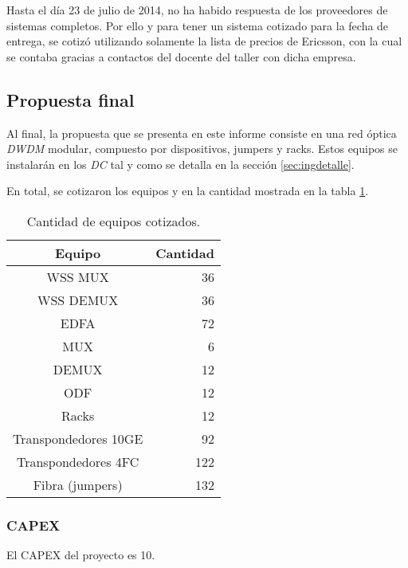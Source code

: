 
Hasta el día 23 de julio de 2014, no ha habido respuesta de los
proveedores de sistemas completos. Por ello y para tener un sistema
cotizado para la fecha de entrega, se cotizó utilizando solamente la
lista de precios de Ericsson, con la cual se contaba gracias a
contactos del docente del taller con dicha empresa.

\subsection{Propuesta final}
\label{sec:ppfinal}

Al final, la propuesta que se presenta en este informe consiste en una
red óptica \emph{DWDM} modular, compuesto por dispositivos, jumpers y
racks. Estos equipos se instalarán en los \emph{DC} tal y como se
detalla en la sección \ref{sec:ingdetalle}.

En total, se cotizaron los equipos y en la cantidad mostrada en la
tabla \ref{tab:propfinal}.

\begin{table}[H]
  \centering
  \begin{tabular}{| c | r |}
    \hline
    Equipo & Cantidad \\
    \hline
    WSS MUX & 36 \\
    WSS DEMUX & 36 \\
    EDFA & 72 \\
    MUX & 6 \\
    DEMUX & 12 \\
    ODF & 12 \\
    Racks & 12 \\
    Transpondedores 10GE & 92 \\
    Transpondedores 4FC & 122 \\
    Fibra (jumpers) & 132 \\
    \hline
  \end{tabular}
  \caption{Cantidad de equipos cotizados.}
  \label{tab:propfinal}
\end{table}

\subsubsection{CAPEX}
\label{sec:capex}

El CAPEX del proyecto es 10.

